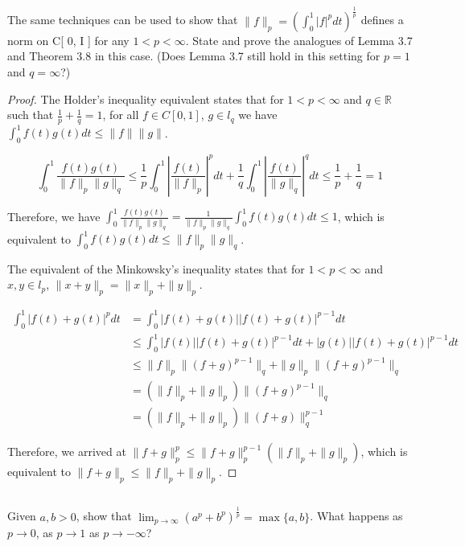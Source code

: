 \subsection{} The same techniques can be used to show that $\|f\|_p = (\int_0^1 |f|^p dt)^\frac{1}{p}$ defines a norm on C[ 0, I ]   for any $1<p<\infty$. State and prove the analogues of Lemma 3.7 and Theorem 3.8 in this case. (Does Lemma 3.7 still hold in this setting for $p  = 1$ and $q = \infty$?)

\begin{proof}

The Holder's inequality equivalent states that for $1 < p < \infty$ and $q \in \mathbb{R}$ such that $\frac{1}{p} + \frac{1}{q} = 1$, for all $f \in C[0,1]$, $g \in l_q$ we have $\int_0^1 f(t)g(t) dt \leq \|f\|\|g\|$.

$$\int_0^1 \frac{f(t)g(t)}{\|f\|_p\|g\|_q} \leq \frac{1}{p}\int_0^1|\frac{f(t)}{\|f\|_p}|^p dt + 
\frac{1}{q}\int_0^1|\frac{f(t)}{\|g\|_q}|^q dt \leq \frac{1}{p} + \frac{1}{q} = 1$$

Therefore, we have $\int_0^1 \frac{f(t)g(t)}{\|f\|_p\|g\|_q} =  \frac{1}{\|f\|_p\|g\|_q} \int_0^1 f(t)g(t) dt \leq 1$, which is equivalent to $\int_0^1 f(t)g(t) dt \leq \|f\|_p\|g\|_q$.

The equivalent of the Minkowsky's inequality states that for $1 < p < \infty$ and $x,y\in l_p$, $\|x+y\|_p = \|x\|_p+\|y\|_p$.

\begin{equation}
\begin{split}
\int_0^1 |f(t) + g(t)|^p dt &= \int_0^1 |f(t) + g(t)||f(t) + g(t)|^{p-1} dt \\&
\leq \int_0^1 |f(t)||f(t) + g(t)|^{p-1} dt  + |g(t)||f(t) + g(t)|^{p-1} dt \\&
\leq \|f\|_p \|(f+g)^{p-1}\|_q + \|g\|_p \|(f+g)^{p-1}\|_q \\&
= (\|f\|_p + \|g\|_p)\|(f+g)^{p-1}\|_q \\&
= (\|f\|_p + \|g\|_p)\|(f+g)\|^{p-1}_q
\end{split}
\end{equation}


Therefore, we arrived at $\|f+g\|_p^p \leq \|f+g\|_p^{p-1}(\|f\|_p + \|g\|_p)$, which is equivalent to $\|f+g\|_p \leq \|f\|_p + \|g\|_p$.

\end{proof}

\subsection{} Given $a,b > 0$, show that $\lim_{p\rightarrow \infty} (a^p + b^p)^\frac{1}{p} = \max\{a, b\}$. What happens as $p \rightarrow 0$, as $p \rightarrow 1$ as $p \rightarrow -\infty$?

